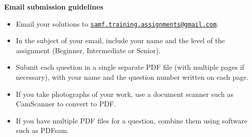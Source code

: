 \documentclass[a4paper,12pt,titlepage]{article}
\begin{document}
\vfill
\textbf{\Large Email submission guidelines}
\begin{itemize}
	\item Email your solutions to \href{mailto:samf.training.assignments@gmail.com}{\texttt{samf.training.assignments@gmail.com}}.
	\item In the subject of your email, include your name and the level of the assignment (Beginner, Intermediate or Senior).
	\item Submit each question in a single separate PDF file (with multiple pages if necessary), with your name and the question number written on each page.
	\item If you take photographs of your work, use a document scanner such as CamScanner to convert to PDF.
	\item If you have multiple PDF files for a question, combine them using software such as PDFsam.
\end{itemize}
\end{document}
